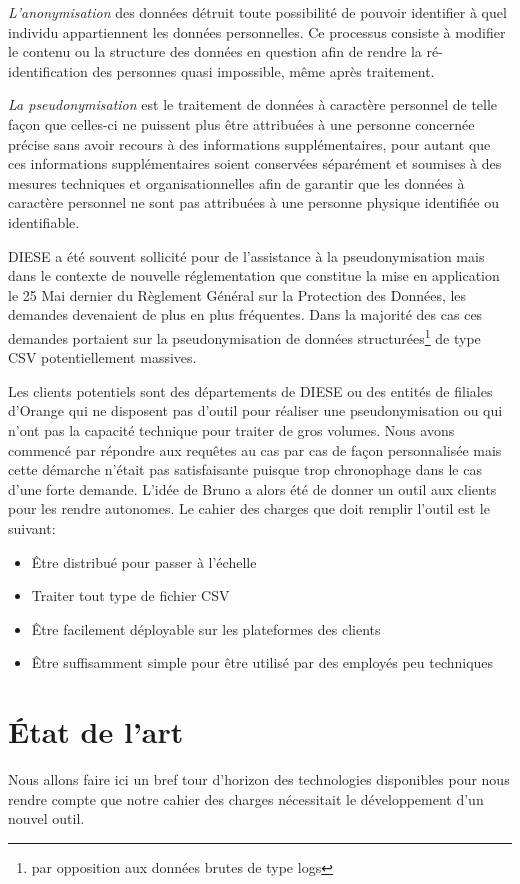 \documentclass[12pt]{report}
\begin{document}
	\textit{L'anonymisation} des données détruit toute possibilité de pouvoir identifier à quel individu appartiennent les données personnelles. Ce processus consiste à modifier le contenu ou la structure des données en question afin de rendre la ré-identification des personnes quasi impossible, même après traitement.
	
	\textit{La pseudonymisation} est le traitement de données à caractère personnel de telle façon que celles-ci ne puissent plus être attribuées à une personne concernée précise sans avoir recours à des informations supplémentaires, pour autant que ces informations supplémentaires soient conservées séparément et soumises à des mesures techniques et organisationnelles afin de garantir que les données à caractère personnel ne sont pas attribuées à une personne physique identifiée ou identifiable.
	
	DIESE a été souvent sollicité pour de l'assistance à la pseudonymisation mais dans le contexte de nouvelle réglementation que constitue la mise en application le 25 Mai dernier du Règlement Général sur la Protection des Données, les demandes devenaient de plus en plus fréquentes. Dans la majorité des cas ces demandes portaient sur la pseudonymisation de données structurées\footnote{par opposition aux données brutes de type logs} de type CSV potentiellement massives. 
	
	Les clients potentiels sont des départements de DIESE ou des entités de filiales d'Orange qui ne disposent pas d'outil pour réaliser une pseudonymisation ou qui n'ont pas la capacité technique pour traiter de gros volumes.
	Nous avons commencé par répondre aux requêtes au cas par cas de façon personnalisée mais cette démarche n'était pas satisfaisante puisque trop chronophage dans le cas d’une forte demande. L'idée de Bruno a alors été de donner un outil aux clients pour les rendre autonomes. Le cahier des charges que doit remplir l'outil est le suivant:
	\begin{itemize}
		\item Être distribué pour passer à l'échelle
		\item Traiter tout type de fichier CSV
		\item Être facilement déployable sur les plateformes des clients
		\item Être suffisamment simple pour être utilisé par des employés peu techniques
	\end{itemize}
	
	\section{État de l'art}
	Nous allons faire ici un bref tour d'horizon des technologies disponibles pour nous rendre compte que notre cahier des charges nécessitait le développement d'un nouvel outil.
	
\end{document}

